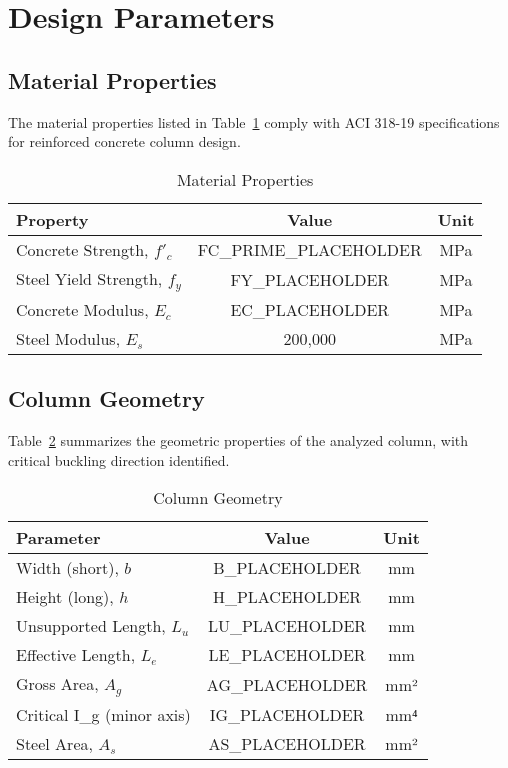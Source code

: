 \documentclass[
  10pt,
  letterpaper,
  twocolumn
]{article}
\begin{document}
\section{Design Parameters}

\subsection{Material Properties}

The material properties listed in Table~\ref{tab:materials} comply with ACI 318-19 specifications for reinforced concrete column design.

\begin{table}[h]
\centering
\caption{Material Properties}
\label{tab:materials}
\begin{tabular}{@{}lcc@{}}
\toprule
\textbf{Property} & \textbf{Value} & \textbf{Unit} \\
\midrule
Concrete Strength, $f'_c$ & FC_PRIME_PLACEHOLDER & MPa \\
Steel Yield Strength, $f_y$ & FY_PLACEHOLDER & MPa \\
Concrete Modulus, $E_c$ & EC_PLACEHOLDER & MPa \\
Steel Modulus, $E_s$ & 200,000 & MPa \\
\bottomrule
\end{tabular}
\end{table}

\subsection{Column Geometry}

Table~\ref{tab:geometry} summarizes the geometric properties of the analyzed column, with critical buckling direction identified.

\begin{table}[h]
\centering
\caption{Column Geometry}
\label{tab:geometry}
\begin{tabular}{@{}lcc@{}}
\toprule
\textbf{Parameter} & \textbf{Value} & \textbf{Unit} \\
\midrule
Width (short), $b$ & B_PLACEHOLDER & mm \\
Height (long), $h$ & H_PLACEHOLDER & mm \\
Unsupported Length, $L_u$ & LU_PLACEHOLDER & mm \\
Effective Length, $L_e$ & LE_PLACEHOLDER & mm \\
Gross Area, $A_g$ & AG_PLACEHOLDER & mm² \\
Critical I_g (minor axis) & IG_PLACEHOLDER & mm⁴ \\
Steel Area, $A_s$ & AS_PLACEHOLDER & mm² \\
\bottomrule
\end{tabular}
\end{table}
\end{document}
